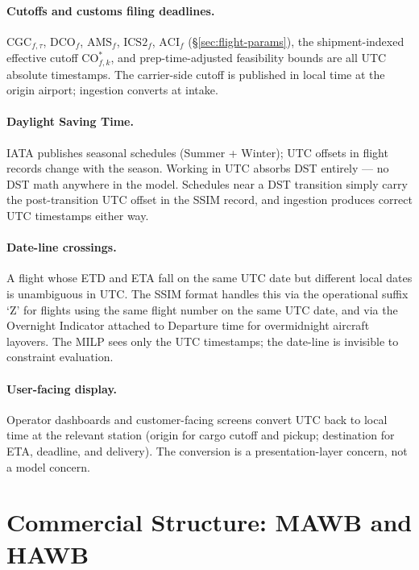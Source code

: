 \documentclass[11pt,a4paper]{article}
\theoremstyle{definition}
\begin{document}
\paragraph{Cutoffs and customs filing deadlines.}
$\text{CGC}_{f,\tau}$, $\text{DCO}_f$, $\text{AMS}_f$, $\text{ICS2}_f$, $\text{ACI}_f$ (\S\ref{sec:flight-params}),
the shipment-indexed effective cutoff $\text{CO}_{f,k}^*$, and prep-time-adjusted
feasibility bounds are all UTC absolute timestamps. The carrier-side cutoff is published
in local time at the origin airport; ingestion converts at intake.

\paragraph{Daylight Saving Time.}
IATA publishes seasonal schedules (Summer + Winter); UTC offsets in flight records change
with the season. Working in UTC absorbs DST entirely --- no DST math anywhere in the
model. Schedules near a DST transition simply carry the post-transition UTC offset in the
SSIM record, and ingestion produces correct UTC timestamps either way.

\paragraph{Date-line crossings.}
A flight whose ETD and ETA fall on the same UTC date but different local dates is
unambiguous in UTC. The SSIM format handles this via the operational suffix `Z' for
flights using the same flight number on the same UTC date, and via the Overnight
Indicator attached to Departure time for overmidnight aircraft layovers. The MILP sees
only the UTC timestamps; the date-line is invisible to constraint evaluation.

\paragraph{User-facing display.}
Operator dashboards and customer-facing screens convert UTC back to local time at the
relevant station (origin for cargo cutoff and pickup; destination for ETA, deadline, and
delivery). The conversion is a presentation-layer concern, not a model concern.

\section{Commercial Structure: MAWB and HAWB}
\label{sec:mawb-hawb}
\end{document}

